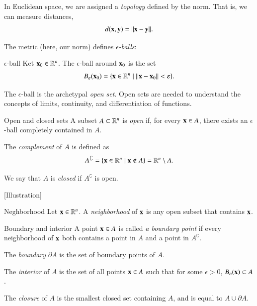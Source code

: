 In Euclidean space, we are assigned a \emph{topology} defined by the norm. That is, we can measure distances,
\begin{equation}
    d(\mathbf{x},\mathbf{y}) = \|\mathbf{x} - \mathbf{y}\|.
\end{equation}

The metric (here, our norm) defines \emph{$\epsilon$-balls}:
\begin{myDefinition}{$\epsilon$-ball}{}
    Ket $\mathbf{x}_0 \in \mathbb{R}^n$.
    The $\epsilon$-ball around $\mathbf{x}_0$ is the set
    \begin{equation}
        B_\varepsilon(\mathbf{x}_0) = \{ \mathbf{x}\in\mathbb{R}^n \mid \|\mathbf{x}-\mathbf{x}_0\| < \varepsilon \}.
    \end{equation}
\end{myDefinition}
The $\epsilon$-ball is the archetypal \emph{open set}. Open sets are needed to understand the concepts of limits, continuity, and differentiation of functions.

\begin{myDefinition}{Open and closed sets}{}
    A subset $A \subset \mathbb{R}^n$ is \emph{open} if, for every $\mathbf{x}\in A$, there exists an $\epsilon$-ball completely contained in $A$.

    The \emph{complement} of $A$ is defined as
    \begin{equation}
        A^\complement = \{ \mathbf{x} \in \mathbb{R}^n \mid \mathbf{x}\notin A \} = \mathbb{R}^n \setminus A.
    \end{equation}

    We say that $A$ is \emph{closed} if $A^\complement$ is open.
\end{myDefinition}

[Illustration]

\begin{myDefinition}{Neghborhood}{}
    Let $\mathbf{x}\in\mathbb{R}^n$. A \emph{neighborhood} of $\mathbf{x}$ is any open subset that contains $\mathbf{x}$.
\end{myDefinition}

\begin{myDefinition}{Boundary and interior}{}
 A point $\mathbf{x}\in A$ is called \emph{a boundary point} if every neighborhood of $\mathbf{x}$ both contains a point in $A$ and a point in $A^\complement$.

 The \emph{boundary} $\partial A$ is the set of boundary points of $A$.

 The \emph{interior} of $A$ is the set of all points $\mathbf{x}\in A$ such that for some $\epsilon>0$, $B_\varepsilon(\mathbf{x}) \subset A$.

 The \emph{closure} of $A$ is the smallest closed set containing $A$, and is equal to $A \cup \partial A$.
\end{myDefinition}

